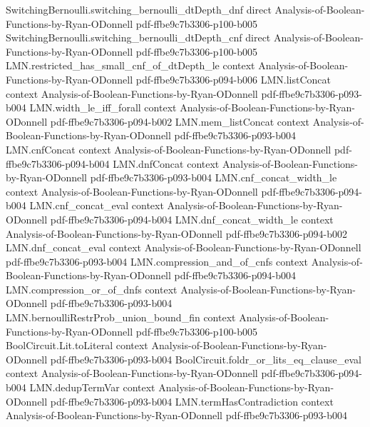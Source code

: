 \begin{lemma}
\proofstep
  {SwitchingBernoulli.switching_bernoulli_dtDepth_dnf}
  {direct}
  {Analysis-of-Boolean-Functions-by-Ryan-ODonnell}
  {pdf-ffbe9c7b3306-p100-b005}
\proofstep
  {SwitchingBernoulli.switching_bernoulli_dtDepth_cnf}
  {direct}
  {Analysis-of-Boolean-Functions-by-Ryan-ODonnell}
  {pdf-ffbe9c7b3306-p100-b005}
\proofstep
  {LMN.restricted_has_small_cnf_of_dtDepth_le}
  {context}
  {Analysis-of-Boolean-Functions-by-Ryan-ODonnell}
  {pdf-ffbe9c7b3306-p094-b006}
\proofstep
  {LMN.listConcat}
  {context}
  {Analysis-of-Boolean-Functions-by-Ryan-ODonnell}
  {pdf-ffbe9c7b3306-p093-b004}
\proofstep
  {LMN.width_le_iff_forall}
  {context}
  {Analysis-of-Boolean-Functions-by-Ryan-ODonnell}
  {pdf-ffbe9c7b3306-p094-b002}
\proofstep
  {LMN.mem_listConcat}
  {context}
  {Analysis-of-Boolean-Functions-by-Ryan-ODonnell}
  {pdf-ffbe9c7b3306-p093-b004}
\proofstep
  {LMN.cnfConcat}
  {context}
  {Analysis-of-Boolean-Functions-by-Ryan-ODonnell}
  {pdf-ffbe9c7b3306-p094-b004}
\proofstep
  {LMN.dnfConcat}
  {context}
  {Analysis-of-Boolean-Functions-by-Ryan-ODonnell}
  {pdf-ffbe9c7b3306-p093-b004}
\proofstep
  {LMN.cnf_concat_width_le}
  {context}
  {Analysis-of-Boolean-Functions-by-Ryan-ODonnell}
  {pdf-ffbe9c7b3306-p094-b004}
\proofstep
  {LMN.cnf_concat_eval}
  {context}
  {Analysis-of-Boolean-Functions-by-Ryan-ODonnell}
  {pdf-ffbe9c7b3306-p094-b004}
\proofstep
  {LMN.dnf_concat_width_le}
  {context}
  {Analysis-of-Boolean-Functions-by-Ryan-ODonnell}
  {pdf-ffbe9c7b3306-p094-b002}
\proofstep
  {LMN.dnf_concat_eval}
  {context}
  {Analysis-of-Boolean-Functions-by-Ryan-ODonnell}
  {pdf-ffbe9c7b3306-p093-b004}
\proofstep
  {LMN.compression_and_of_cnfs}
  {context}
  {Analysis-of-Boolean-Functions-by-Ryan-ODonnell}
  {pdf-ffbe9c7b3306-p094-b004}
\proofstep
  {LMN.compression_or_of_dnfs}
  {context}
  {Analysis-of-Boolean-Functions-by-Ryan-ODonnell}
  {pdf-ffbe9c7b3306-p093-b004}
\proofstep
  {LMN.bernoulliRestrProb_union_bound_fin}
  {context}
  {Analysis-of-Boolean-Functions-by-Ryan-ODonnell}
  {pdf-ffbe9c7b3306-p100-b005}
\proofstep
  {BoolCircuit.Lit.toLiteral}
  {context}
  {Analysis-of-Boolean-Functions-by-Ryan-ODonnell}
  {pdf-ffbe9c7b3306-p093-b004}
\proofstep
  {BoolCircuit.foldr_or_lits_eq_clause_eval}
  {context}
  {Analysis-of-Boolean-Functions-by-Ryan-ODonnell}
  {pdf-ffbe9c7b3306-p094-b004}
\proofstep
  {LMN.dedupTermVar}
  {context}
  {Analysis-of-Boolean-Functions-by-Ryan-ODonnell}
  {pdf-ffbe9c7b3306-p093-b004}
\proofstep
  {LMN.termHasContradiction}
  {context}
  {Analysis-of-Boolean-Functions-by-Ryan-ODonnell}
  {pdf-ffbe9c7b3306-p093-b004}
\proofstep

\end{lemma}
